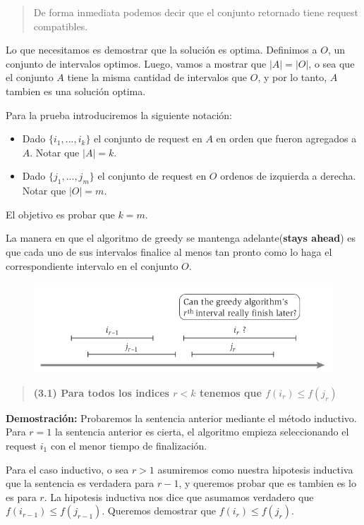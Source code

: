 \documentclass{article}
\begin{document}
\begin{quote}
    De forma inmediata podemos decir que el conjunto retornado tiene request compatibles.
\end{quote}

Lo que necesitamos es demostrar que la solución es optima. Definimos a \(O\), un conjunto de intervalos optimos. 
Luego, vamos a mostrar que \(|A| = |O|\), o sea que el conjunto \(A\) tiene la misma cantidad de intervalos que \(O\), y por lo tanto, \(A\) tambien es una solución optima.

Para la prueba introduciremos la siguiente notación:
\begin{itemize}
    \item Dado \(\{i_1,...,i_k\}\) el conjunto de request en \(A\) en orden que fueron agregados a \(A\). Notar que \(|A|=k\).
    \item Dado \(\{j_1,...,j_m\}\) el conjunto de request en \(O\) ordenos de izquierda a derecha. Notar que \(|O|=m\).
\end{itemize}
El objetivo es probar que \(k=m\).

La manera en que el algoritmo de greedy se mantenga adelante(\textbf{stays ahead}) es que cada uno de sus intervalos finalice al menos tan pronto como lo haga el correspondiente intervalo en el conjunto \(O\).

\begin{figure}[h!]
    \includegraphics[width=\linewidth]{imagenes/demo-greedy-intervalos.png}
\end{figure}

\begin{quote}
    \textbf{(3.1) Para todos los indices \(r<k\) tenemos que \(f(i_r) \leq f(j_r)\)}
\end{quote}

\textbf{Demostración:}  Probaremos la sentencia anterior mediante el método inductivo. Para \(r=1\) la sentencia anterior es cierta, el algoritmo empieza seleccionando el request \(i_1\) con el menor tiempo de finalización.

Para el caso inductivo, o sea \(r>1\) asumiremos como nuestra hipotesis inductiva que la sentencia es verdadera para \(r-1\), y queremos probar que es tambien es lo es para \(r\). La hipotesis inductiva nos dice que asumamos verdadero que \(f(i_{r-1}) \leq f(j_{r-1})\). Queremos demostrar que \(f(i_{r}) \leq f(j_{r})\).
\end{document}
